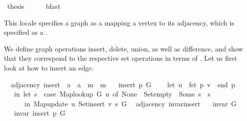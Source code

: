 \begin{isabellebody}
\ {\isacharquery}{\kern0pt}thesis\isanewline
\ \ \ \ \isamarkupfalse%
\ blast\isanewline
{}\isamarkupfalse%
%
\endisatagproof
{\isafoldproof}%
%
\isadelimproof
%
\endisadelimproof
%
\begin{isamarkuptext}%
This locale specifies a graph as a  mapping a vertex to its adjacency, which
is specified as a .%
\end{isamarkuptext}\isamarkuptrue%
%
\begin{isamarkuptext}%
We define graph operations insert, delete, union, as well as difference, and show that they
correspond to the respective set operations in terms of . Let us
first look at how to insert an edge.%
\end{isamarkuptext}\isamarkuptrue%
\isamarkupfalse%
\ {\isacharparenleft}{\kern0pt}\ adjacency{\isacharparenright}{\kern0pt}\ insert\ {\isacharcolon}{\kern0pt}{\isacharcolon}{\kern0pt}\ {\isachardoublequoteopen}{\isacharprime}{\kern0pt}a\ {\isasymtimes}\ {\isacharprime}{\kern0pt}a\ {\isasymRightarrow}\ {\isacharprime}{\kern0pt}m\ {\isasymRightarrow}\ {\isacharprime}{\kern0pt}m{\isachardoublequoteclose}\ \isanewline
\ \ {\isachardoublequoteopen}insert\ p\ G\ {\isasymequiv}\isanewline
\ \ \ let\ u\ {\isacharequal}{\kern0pt}\ fst\ p{\isacharsemicolon}{\kern0pt}\ v\ {\isacharequal}{\kern0pt}\ snd\ p\isanewline
\ \ \ in\ let\ s\ {\isacharequal}{\kern0pt}\ case\ Map{\isacharunderscore}{\kern0pt}lookup\ G\ u\ of\ None\ {\isasymRightarrow}\ Set{\isacharunderscore}{\kern0pt}empty\ {\isacharbar}{\kern0pt}\ Some\ s{\isacharprime}{\kern0pt}\ {\isasymRightarrow}\ s{\isacharprime}{\kern0pt}\isanewline
\ \ \ \ \ \ in\ Map{\isacharunderscore}{\kern0pt}update\ u\ {\isacharparenleft}{\kern0pt}Set{\isacharunderscore}{\kern0pt}insert\ v\ s{\isacharparenright}{\kern0pt}\ G{\isachardoublequoteclose}\isanewline
\isanewline
{}\isamarkupfalse%
\ {\isacharparenleft}{\kern0pt}\ adjacency{\isacharparenright}{\kern0pt}\ invar{\isacharunderscore}{\kern0pt}insert{\isacharcolon}{\kern0pt}\isanewline
\ \ \ {\isachardoublequoteopen}invar\ G{\isachardoublequoteclose}\isanewline
\ \ \ {\isachardoublequoteopen}invar\ {\isacharparenleft}{\kern0pt}insert\ p\ G{\isacharparenright}{\kern0pt}{\isachardoublequoteclose}\isanewline

\end{isabellebody}
